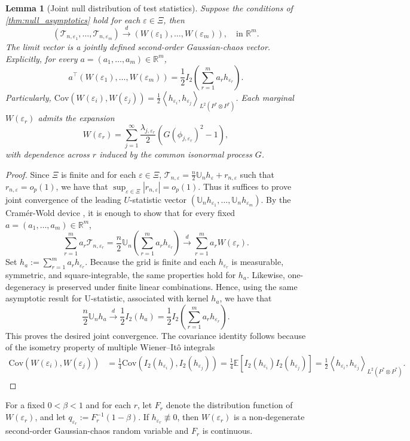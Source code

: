 \documentclass{article}
\theoremstyle{plain}
\newtheorem{lemma}[theorem]{Lemma}
\theoremstyle{definition}
\theoremstyle{remark}
\newcommand{\R}{\mathbb{R}}
\newcommand{\E}{\mathbb{E}}
\newcommand{\U}{\mathbb{U}}
\newcommand{\of}[1]{\left(#1\right)}
\newcommand{\off}[1]{\left[#1\right]}
\newcommand{\abs}[1]{\left|#1\right|}
\newcommand{\Cov}{\text{Cov}}
\newcommand{\cT}{\mathcal{T}}
\newcommand{\1}{\mathbbm{1}}
\newcommand{\eps}{\varepsilon}
\newcommand{\iprod}[1]{\left\langle #1 \right\rangle}
\theoremstyle{plain}
\theoremstyle{definition}
\begin{document}
\begin{lemma}[Joint null distribution of test statistics]\label{lem:joint_eps_null_distribution}
    Suppose the conditions of \cref{thm:null_asymptotics} hold for each $\eps \in \Xi$, then
    \begin{equation}\label{eq:joint_eps_null_distribution}
        \of{\cT_{n, \eps_1}, \dots, \cT_{n, \eps_m}} \xrightarrow[]{d} \of{W(\eps_1), \dots, W(\eps_m)}, \quad \text{in } \R^m.
    \end{equation}
    The limit vector is a jointly defined second-order Gaussian-chaos vector. Explicitly, for every $a = (a_1, \dots, a_m) \in \R^m$,
    \[
    a^\top \of{W(\eps_1), \dots, W(\eps_m)} = \frac{1}{2} I_2\of{\sum_{r=1}^m a_r h_{\eps_r}}.
    \]
    Particularly, $\Cov(W(\eps_i), W(\eps_j)) = \frac{1}{2} \iprod{h_{\eps_i}, h_{\eps_j}}_{L^2(P^* \otimes P^*)}$.
    Each marginal $W(\eps_r)$ admits the expansion
    \[
    W(\eps_r) = \sum_{j=1}^\infty \frac{\lambda_{j, \eps_r}}{2} \of{G(\phi_{j, \eps_r})^2 - 1},
    \]
    with dependence across $r$ induced by the common isonormal process $G$. 
\end{lemma}
\begin{proof}
    Since $\Xi$ is finite and for each $\eps \in \Xi$, $\cT_{n, \eps} = \frac{n}{2}\U_n h_{\eps} + r_{n, \eps}$ such that $r_{n, \eps} = o_p(1)$, we have that $\sup_{\eps \in \Xi} \abs{r_{n, \eps}} = o_p(1)$. Thus it suffices to prove joint convergence of the leading $U$-statistic vector $\of{\U_n h_{\eps_1}, \dots, \U_n h_{\eps_m}}$. By the Cramér-Wold device \citep[Thm.~2.1]{van2000asymptotic}, it is enough to show that for every fixed $a=(a_1,\dots,a_m)\in\R^m$,
    \[
    \sum_{r=1}^m a_r \cT_{n, \eps_r}
    = \frac{n }{2}\U_n\of{\sum_{r=1}^m a_r h_{\eps_r}} \xrightarrow[]{d} \sum_{r=1}^m a_r W(\eps_r).
    \]
    Set $h_a := \sum_{r=1}^m a_r h_{\eps_r}$. Because the grid is finite and each $h_{\eps_r}$ is measurable, symmetric, and square-integrable, the same properties hold for $h_a$. Likewise, one-degeneracy is preserved under finite linear combinations. Hence, using the same asymptotic result for U-statistic, associated with kernel $h_a$, we have that
    \[
    \frac{n }{2}\U_n h_a \xrightarrow[]{d} \frac{1}{2} I_2(h_a) = \frac{1}{2}I_2 \of{\sum_{r=1}^m a_r h_{\eps_r}}.
    \]
    This proves the desired joint convergence. The covariance identity follows because of the isometry property of multiple Wiener–Itô integrals \citep[Def.~3.1]{nualart2019malliavin} 
    \begin{align*}
        \Cov(W(\eps_i), W(\eps_j)) &= \frac{1}{4} \Cov(I_2(h_{\eps_i}), I_2(h_{\eps_j})) = \frac{1}{4} \E\off{I_2(h_{\eps_i}) I_2(h_{\eps_j})} = \frac{1}{2} \iprod{h_{\eps_i}, h_{\eps_j}}_{L^2(P^* \otimes P^*)}.
    \end{align*}

\end{proof}
For a fixed $0 < \beta < 1$ and for each $r$, let $F_r$ denote the distribution function of $W(\varepsilon_r)$, and let $q_{\varepsilon_r}:=F_r^{-1}(1-\beta)$.
If $h_{\varepsilon_r}\not\equiv 0$, then $W(\varepsilon_r)$ is a non-degenerate second-order Gaussian-chaos random variable and $F_r$ is continuous.
\end{document}
